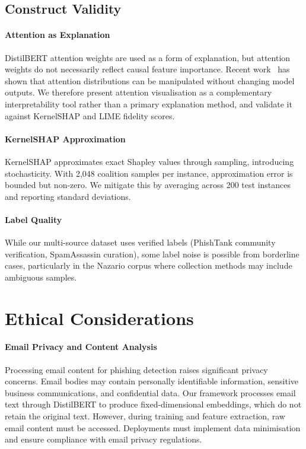 \documentclass[conference]{IEEEtran}
\begin{document}
\subsection{Construct Validity}
\label{subsec:construct_threats}

\paragraph{Attention as Explanation}
DistilBERT attention weights are used as a form of explanation, but
attention weights do not necessarily reflect causal feature importance.
Recent work~\cite{jain2019attention} has shown that attention distributions
can be manipulated without changing model outputs. We therefore present
attention visualisation as a complementary interpretability tool rather
than a primary explanation method, and validate it against KernelSHAP
and LIME fidelity scores.

\paragraph{KernelSHAP Approximation}
KernelSHAP approximates exact Shapley values through sampling, introducing
stochasticity. With 2,048 coalition samples per instance, approximation
error is bounded but non-zero. We mitigate this by averaging across 200
test instances and reporting standard deviations.

\paragraph{Label Quality}
While our multi-source dataset uses verified labels (PhishTank community
verification, SpamAssassin curation), some label noise is possible from
borderline cases, particularly in the Nazario corpus where collection
methods may include ambiguous samples.

\section{Ethical Considerations}
\label{sec:ethics}

\paragraph{Email Privacy and Content Analysis}
Processing email content for phishing detection raises significant privacy
concerns. Email bodies may contain personally identifiable information,
sensitive business communications, and confidential data. Our framework
processes email text through DistilBERT to produce fixed-dimensional
embeddings, which do not retain the original text. However, during
training and feature extraction, raw email content must be accessed.
Deployments must implement data minimisation and ensure compliance with
email privacy regulations.
\end{document}
